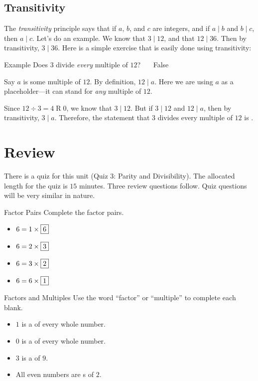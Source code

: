 \documentclass[a4paper,10pt]{report}
\begin{document}
\subsection{Transitivity}

The \emph{transitivity} principle says that if $a$, $b$, and $c$ are integers,
and if $a \mid b$ and $b \mid c$, then $a \mid c$. Let's do an example. We know
that $3 \mid 12$, and that $12 \mid 36$. Then by transitivity, $3 \mid 36$. Here
is a simple exercise that is easily done using transitivity:

\begin{problem}{Example}
 Does $3$ divide \emph{every} multiple of $12$? \hfill {}~~~False

 \begin{solution}
  Say $a$ is some multiple of $12$. By definition, $12 \mid a$. Here we are
  using $a$ as a placeholder---it can stand for \emph{any} multiple of $12$.

  Since $12 \div 3 = 4 \operatorname{R} 0$, we know that $3 \mid 12$. But if $3
  \mid 12$ and $12 \mid a$, then by transitivity, $3 \mid a$. Therefore, the
  statement that $3$ divides every multiple of $12$ is .
 \end{solution}
\end{problem}

\section{Review}

There is a quiz for this unit (Quiz 3: Parity and Divisibility). The allocated
length for the quiz is $15$ minutes. Three review questions follow. Quiz
questions will be very similar in nature.

\begin{problem}{Factor Pairs}
 Complete the factor pairs.

 \begin{itemize}
  \item $6 = 1 \times \Ans{6}$
  \item $6 = 2 \times \Ans{3}$
  \item $6 = 3 \times \Ans{2}$
  \item $6 = 6 \times \Ans{1}$
 \end{itemize}
\end{problem}

\begin{problem}{Factors and Multiples}
 Use the word ``factor'' or ``multiple'' to complete each blank.

 \begin{itemize}
  \item $1$ is a  of every whole number.
  \item $0$ is a  of every whole number.
  \item $3$ is a  of $9$.
  \item All even numbers are s of $2$.
 \end{itemize}
\end{problem}
\end{document}
